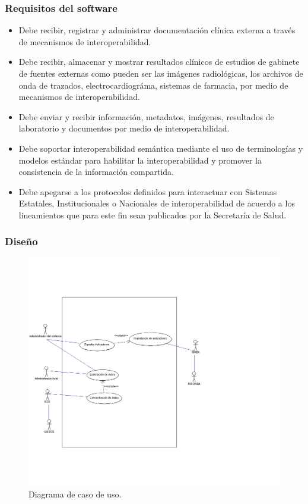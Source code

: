           \subsubsection{Requisitos del software}
          \begin{itemize}
            \item Debe recibir, registrar y administrar documentación clínica externa a través de mecanismos de interoperabilidad.
            \item Debe recibir, almacenar y mostrar resultados clínicos de estudios de gabinete de fuentes externas como pueden ser las imágenes radiológicas, los archivos de onda de trazados, electrocardiográma, sistemas de farmacia, por medio de mecanismos de interoperabilidad.
            \item Debe enviar y recibir información, metadatos, imágenes, resultados de laboratorio y documentos por medio de interoperabilidad.
            \item Debe soportar interoperabilidad semántica mediante el uso de terminologías y modelos estándar para habilitar la interoperabilidad y promover la consistencia de la información compartida.
            \item Debe apegarse a los protocolos definidos para interactuar con Sistemas Estatales, Institucionales o Nacionales de interoperabilidad de acuerdo a los lineamientos que para este fin sean publicados por la Secretaría de Salud.

          \end{itemize}

          \subsubsection{Diseño}

          \begin{figure}[h]
            \centering
            \includegraphics[scale=.3]{lib/assets/casodeuso}
            \caption{Diagrama de caso de uso.}
            \label{metodologia}
          \end{figure}

